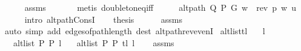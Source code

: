 \begin{isabellebody}
\ \ \ \ \isamarkupfalse%
\ assms{\isacharparenleft}{\kern0pt}{}{\isacharcomma}{\kern0pt}\ {}{\isacharparenright}{\kern0pt}\isanewline
\ \ \ \ \isamarkupfalse%
\ {\isacharparenleft}{\kern0pt}metis\ doubleton{\isacharunderscore}{\kern0pt}eq{\isacharunderscore}{\kern0pt}iff{\isacharparenright}{\kern0pt}{\isacharplus}{\kern0pt}\isanewline
\ \ \isamarkupfalse%
\ \isamarkupfalse%
\ {\isachardoublequoteopen}alt{\isacharunderscore}{\kern0pt}path\ Q\ P\ G\ {\isacharparenleft}{\kern0pt}w\ {\isacharhash}{\kern0pt}\ rev\ p{\isacharparenright}{\kern0pt}\ w\ u{\isachardoublequoteclose}\isanewline
\ \ \ \ \isamarkupfalse%
\ {\isacharparenleft}{\kern0pt}intro\ alt{\isacharunderscore}{\kern0pt}path{\isacharunderscore}{\kern0pt}ConsI{\isacharparenright}{\kern0pt}\isanewline
\ \ \isamarkupfalse%
\ {\isacharquery}{\kern0pt}thesis\isanewline
\ \ \ \ \isamarkupfalse%
\ assms{\isacharparenleft}{\kern0pt}{}{\isacharparenright}{\kern0pt}\isanewline
\ \ \ \ \isamarkupfalse%
\ {\isacharparenleft}{\kern0pt}auto\ simp\ add{\isacharcolon}{\kern0pt}\ edges{\isacharunderscore}{\kern0pt}of{\isacharunderscore}{\kern0pt}path{\isacharunderscore}{\kern0pt}length\ dest{\isacharcolon}{\kern0pt}\ alt{\isacharunderscore}{\kern0pt}path{\isacharunderscore}{\kern0pt}rev{\isacharunderscore}{\kern0pt}evenI{\isacharparenright}{\kern0pt}\isanewline
{}\isamarkupfalse%
%
\endisatagproof
{\isafoldproof}%
%
\isadelimproof
\isanewline
%
\endisadelimproof
%
\isadeliminvisible
\isanewline
%
\endisadeliminvisible
%
\isataginvisible
{}\isamarkupfalse%
\ alt{\isacharunderscore}{\kern0pt}list{\isacharunderscore}{\kern0pt}tl{\isacharcolon}{\kern0pt}\isanewline
\ \ \ {\isachardoublequoteopen}l\ {\isasymnoteq}\ {\isacharbrackleft}{\kern0pt}{\isacharbrackright}{\kern0pt}{\isachardoublequoteclose}\isanewline
\ \ \ {\isachardoublequoteopen}alt{\isacharunderscore}{\kern0pt}list\ P{}\ P{}\ l{\isachardoublequoteclose}\isanewline
\ \ \ {\isachardoublequoteopen}alt{\isacharunderscore}{\kern0pt}list\ P{}\ P{}\ {\isacharparenleft}{\kern0pt}tl\ l{\isacharparenright}{\kern0pt}{\isachardoublequoteclose}%
\endisataginvisible
{\isafoldinvisible}%
%
\isadeliminvisible
\isanewline
%
\endisadeliminvisible
%
\isadelimproof
\ \ %
\endisadelimproof
%
\isatagproof
{}\isamarkupfalse%
\ assms\isanewline
\ \ \isamarkupfalse%

\end{isabellebody}
